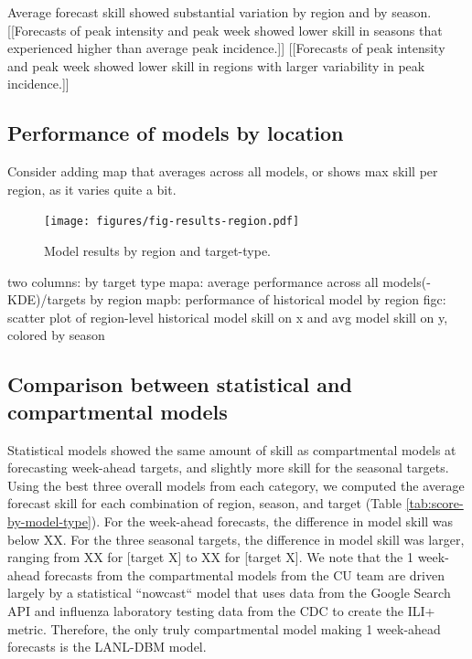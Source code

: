 \documentclass{article}\usepackage[]{graphicx}\usepackage[]{color}
\begin{document}
Average forecast skill showed substantial variation by region and by season.
[[Forecasts of peak intensity and peak week showed lower skill in seasons that experienced higher than average peak incidence.]]
[[Forecasts of peak intensity and peak week showed lower skill in regions with larger variability in peak incidence.]]



\subsection{Performance of models by location}

Consider adding map that averages across all models, or shows max skill per region, as it varies quite a bit.

\begin{figure}[htbp]
\begin{center}
\texttt{[image: figures/fig-results-region.pdf]}
\caption{Model results by region and target-type.}
\label{fig:results-region}
\end{center}
\end{figure}


two columns: by target type
mapa: average performance across all models(-KDE)/targets by region
mapb: performance of historical model by region
figc: scatter plot of region-level historical model skill on x and avg model skill on y, colored by season


\subsection{Comparison between statistical and compartmental models}


Statistical models showed the same amount of skill as compartmental models at forecasting week-ahead targets, and slightly more skill for the seasonal targets. 
Using the best three overall models from each category, we computed the average forecast skill for each combination of region, season, and target (Table \ref{tab:score-by-model-type}). 
For the week-ahead forecasts, the difference in model skill was below XX.
For the three seasonal targets, the difference in model skill was larger, ranging from XX for [target X] to XX for [target X].
We note that the 1 week-ahead forecasts from the compartmental models from the CU team are driven largely by a statistical ``nowcast`` model that uses data from the Google Search API and influenza laboratory testing data from the CDC to create the ILI+ metric.\cite{yang2014}
Therefore, the only truly compartmental model making 1 week-ahead forecasts is the LANL-DBM model. 
\end{document}
